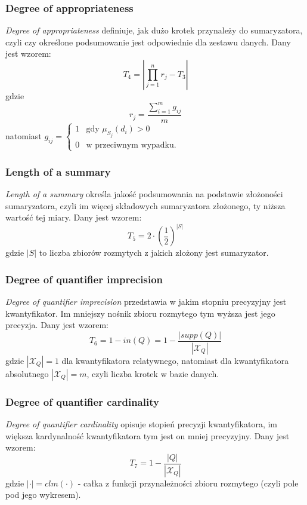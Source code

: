\documentclass{classrep}
\begin{document}
	\subsubsection{Degree of appropriateness}
\textsl{Degree of appropriateness} definiuje, jak dużo krotek przynależy do sumaryzatora, czyli czy określone podsumowanie jest odpowiednie dla zestawu danych. Dany jest wzorem:
\begin{equation}
T_4 = \left| \prod_{j=1}^{n} r_j - T_3\right|
\end{equation}
gdzie
\begin{equation}
r_j = \frac{\sum_{i=1}^{m} g_{ij}}{m}
\end{equation}
natomiast
$
g_{ij} = \begin{cases}
1 & \mbox{gdy } \mu_{S_j}(d_i) > 0 \\
0 & \mbox{w przeciwnym wypadku.}
\end{cases}
$


	\subsubsection{Length of a summary}
\textsl{Length of a summary}  określa jakość podsumowania na podstawie złożoności sumaryzatora, czyli im więcej składowych sumaryzatora złożonego, ty niższa wartość tej miary. Dany jest wzorem:
\begin{equation}
T_5 = 2 \cdot \left( \frac{1}{2}\right)^{|S|} 
\end{equation}
gdzie $|S|$ to liczba zbiorów rozmytych z jakich złożony jest sumaryzator.


	\subsubsection{Degree of quantifier imprecision}
\textsl{Degree of quantifier imprecision} przedstawia w jakim stopniu precyzyjny jest kwantyfikator. Im mniejszy nośnik zbioru rozmytego  tym wyższa jest jego precyzja. Dany jest wzorem:
\begin{equation}
T_6 = 1 - in(Q) = 1 - \frac{|supp(Q)|}{|\mathcal{X}_Q|}
\end{equation}
gdzie $|\mathcal{X}_Q| = 1$ dla kwantyfikatora relatywnego, natomiast dla kwantyfikatora absolutnego $|\mathcal{X}_Q| = m$, czyli liczba krotek w bazie danych.


	\subsubsection{Degree of quantifier cardinality}
\textsl{Degree of quantifier cardinality} opisuje stopień precyzji kwantyfikatora, im większa kardynalność kwantyfikatora tym jest on mniej precyzyjny. Dany jest wzorem:
\begin{equation}
T_7 = 1 - \frac{|Q|}{|\mathcal{X}_Q|}
\end{equation}
gdzie $|\cdot| = clm(\cdot)$ - całka z funkcji przynależności zbioru rozmytego (czyli pole pod jego wykresem).
\end{document}
